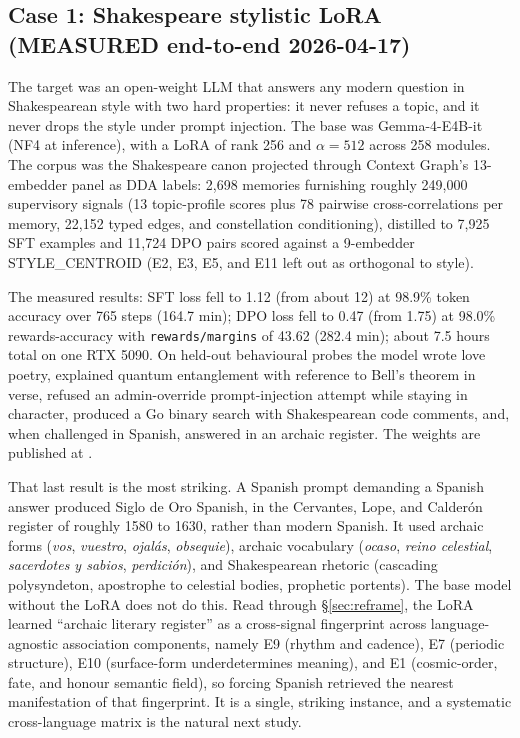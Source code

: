 \documentclass[10pt,twocolumn]{article}
\begin{document}
\subsection{Case 1: Shakespeare stylistic LoRA (MEASURED end-to-end 2026-04-17)}
The target was an open-weight LLM that answers any modern question in Shakespearean
style with two hard properties: it never refuses a topic, and it never drops the
style under prompt injection. The base was Gemma-4-E4B-it (NF4 at inference), with
a LoRA of rank 256 and $\alpha=512$ across 258 modules. The corpus was the
Shakespeare canon projected through Context Graph's 13-embedder panel as DDA
labels: 2{,}698 memories furnishing roughly 249{,}000 supervisory signals (13
topic-profile scores plus 78 pairwise cross-correlations per memory, 22{,}152 typed
edges, and constellation conditioning), distilled to 7{,}925 SFT examples and
11{,}724 DPO pairs scored against a 9-embedder STYLE\_CENTROID (E2, E3, E5, and E11
left out as orthogonal to style).

The measured results: SFT loss fell to 1.12 (from about 12) at 98.9\% token
accuracy over 765 steps (164.7 min); DPO loss fell to 0.47 (from 1.75) at 98.0\%
rewards-accuracy with \texttt{rewards/margins} of 43.62 (282.4 min); about 7.5
hours total on one RTX 5090. On held-out behavioural probes the model wrote love
poetry, explained quantum entanglement with reference to Bell's theorem in verse,
refused an admin-override prompt-injection attempt while staying in character,
produced a Go binary search with Shakespearean code comments, and, when challenged
in Spanish, answered in an archaic register. The weights are published at
.

That last result is the most striking. A Spanish prompt demanding a Spanish answer
produced Siglo de Oro Spanish, in the Cervantes, Lope, and Calder\'on register of
roughly 1580 to 1630, rather than modern Spanish. It used archaic forms
(\emph{vos}, \emph{vuestro}, \emph{ojal\'as}, \emph{obsequie}), archaic vocabulary
(\emph{ocaso}, \emph{reino celestial}, \emph{sacerdotes y sabios},
\emph{perdici\'on}), and Shakespearean rhetoric (cascading polysyndeton,
apostrophe to celestial bodies, prophetic portents). The base model without the
LoRA does not do this. Read through \S\ref{sec:reframe}, the LoRA learned ``archaic
literary register'' as a cross-signal fingerprint across language-agnostic
association components, namely E9 (rhythm and cadence), E7 (periodic structure),
E10 (surface-form underdetermines meaning), and E1 (cosmic-order, fate, and honour
semantic field), so forcing Spanish retrieved the nearest manifestation of that
fingerprint. It is a single, striking instance, and a systematic cross-language
matrix is the natural next study.
\end{document}
